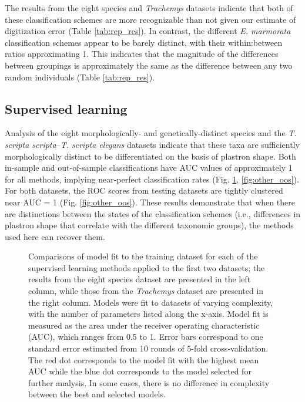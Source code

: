 \documentclass[10pt,letterpaper]{article}
\begin{document}
The results from the eight species and \textit{Trachemys} datasets indicate that both of these classification schemes are more recognizable than not given our estimate of digitization error (Table \ref{tab:rep_res}). In contrast, the different \textit{E. marmorata} classification schemes appear to be barely distinct, with their within:between ratios approximating 1. This indicates that the magnitude of the differences between groupings is approximately the same as the difference between any two random individuals (Table \ref{tab:rep_res}).


\subsection*{Supervised learning}

Analysis of the eight morphologically- and genetically-distinct species and the \textit{T. scripta scripta}--\textit{T. scripta elegans} datasets indicate that these taxa are sufficiently morphologically distinct to be differentiated on the basis of plastron shape. Both in-sample and out-of-sample classifications have AUC values of approximately 1 for all methods, implying near-perfect classification rates (Fig. \ref{fig:other_sel}, \ref{fig:other_oos}). For both datasets, the ROC scores from testing datasets are tightly clustered near AUC = 1 (Fig. \ref{fig:other_oos}). These results demonstrate that when there are distinctions between the states of the classification schemes (i.e., differences in plastron shape that correlate with the different taxonomic groups), the methods used here can recover them.

\begin{figure}[h]
  \centering
  \caption{Comparisons of model fit to the training dataset for each of the supervised learning methods applied to the first two datasets; the results from the eight species dataset are presented in the left column, while those from the \textit{Trachemys} dataset are presented in the right column. Models were fit to datasets of varying complexity, with the number of parameters listed along the x-axis. Model fit is measured as the area under the receiver operating characteristic (AUC), which ranges from 0.5 to 1. Error bars correspond to one standard error estimated from 10 rounds of 5-fold cross-validation. The red dot corresponds to the model fit with the highest mean AUC while the blue dot corresponds to the model selected for further analysis. In some cases, there is no difference in complexity between the best and selected models.}
  \label{fig:other_sel}
\end{figure}
\end{document}
